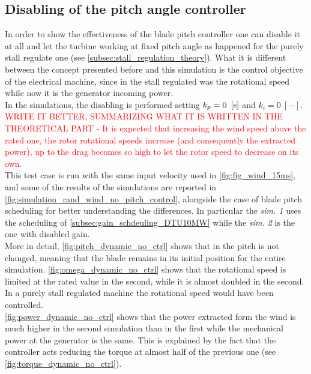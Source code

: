 \subsection{Disabling of the pitch angle controller}
In order to show the effectiveness of the blade pitch controller one can disable it at all and let the turbine working at fixed pitch angle as happened for the purely stall regulate one (see \autoref{subsec:stall_regulation_theory}). What it is different between the concept presented before and this simulation is the control objective of the electrical machine, since in the stall regulated was the rotational speed while now it is the generator incoming power. \\
In the simulations, the disabling is performed setting $k_p=0 \ \left[\si{\second}\right]$ and $k_i=0 \ [-]$. \textcolor{red}{WRITE IT BETTER, SUMMARIZING WHAT IT IS WRITTEN IN THE THEORETICAL PART - It is expected that increasing the wind speed above the rated one, the rotor rotational speeds increase (and consequently the extracted power), up to the drag becomes so high to let the rotor speed to decrease on its own. }\\
This test case is run with the same input velocity used in \autoref{fig:fig_wind_15ms}, and some of the results of the simulations are reported in \autoref{fig:simulation_rand_wind_no_pitch_control}, alongside the case of blade pitch scheduling for better understanding the differences. In particular the \textit{sim. 1} uses the scheduling of \autoref{subsec:gain_schdeuling_DTU10MW} while the \textit{sim. 2} is the one with disabled gain.\\
More in detail, \autoref{fig:pitch_dynamic_no_ctrl} shows that in  the pitch is not changed, meaning that the blade remains in its initial position for the entire simulation. \autoref{fig:omega_dynamic_no_ctrl} shows that the rotational speed is limited at the rated value in the second, while it is almost doubled in the second. In a purely stall regulated machine the rotational speed would have been controlled.\\
\autoref{fig:power_dynamic_no_ctrl} shows that the power extracted form the wind is much higher in the second simulation than in the first while the mechanical power at the generator is the same. This is explained by the fact that the controller acts reducing the torque at almost half of the previous one (see \autoref{fig:torque_dynamic_no_ctrl}).

